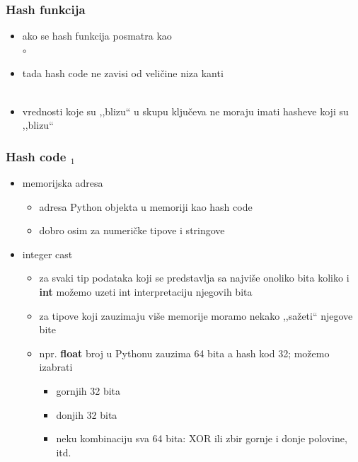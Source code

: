 \documentclass[compress]{beamer}
\begin{document}
\begin{frame}[fragile]
  \frametitle{Hash funkcija}
  \begin{itemize}
    \item ako se hash funkcija posmatra kao \\  $\circ$ 
    \item tada hash code ne zavisi od veličine niza kanti \\ \ \\
    \item vrednosti koje su ,,blizu`` u skupu ključeva ne moraju imati hasheve koji su ,,blizu`` 
  \end{itemize}
\end{frame}

\begin{frame}[fragile]
  \frametitle{Hash code $_1$}
  \begin{itemize}
    \item memorijska adresa
    \begin{itemize}
      \item adresa Python objekta u memoriji kao hash code
      \item dobro osim za numeričke tipove i stringove
    \end{itemize}
    \item integer cast 
    \begin{itemize}
      \item za svaki tip podataka koji se predstavlja sa najviše onoliko bita koliko i \textbf{int} možemo uzeti int interpretaciju njegovih bita
      \item za tipove koji zauzimaju više memorije moramo nekako ,,sažeti`` njegove bite
      \item npr. \textbf{float} broj u Pythonu zauzima 64 bita a hash kod 32; možemo izabrati
      \begin{itemize}
        \item gornjih 32 bita
        \item donjih 32 bita
        \item neku kombinaciju sva 64 bita: XOR ili zbir gornje i donje polovine, itd.
      \end{itemize}
    \end{itemize}
  \end{itemize}
\end{frame}
\end{document}
